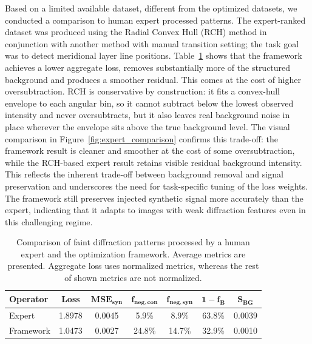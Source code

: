 \documentclass[iucr]{iucrjournals}
\begin{document}
Based on a limited available dataset, different from the optimized datasets, we conducted a comparison to human expert processed patterns. The expert-ranked dataset was produced using the Radial Convex Hull (RCH) method in conjunction with another method with manual transition setting; the task goal was to detect meridional layer line positions. Table~\ref{tab:expert_comparison_metrics} shows that the framework achieves a lower aggregate loss, removes substantially more of the structured background and produces a smoother residual. This comes at the cost of higher oversubtraction. RCH is conservative by construction: it fits a convex-hull envelope to each angular bin, so it cannot subtract below the lowest observed intensity and never oversubtracts, but it also leaves real background noise in place wherever the envelope sits above the true background level. The visual comparison in Figure~\ref{fig:expert_comparison} confirms this trade-off: the framework result is cleaner and smoother at the cost of some oversubtraction, while the RCH-based expert result retains visible residual background intensity. This reflects the inherent trade-off between background removal and signal preservation and underscores the need for task-specific tuning of the loss weights. The framework still preserves injected synthetic signal more accurately than the expert, indicating that it adapts to images with weak diffraction features even in this challenging regime.

\begin{table}[htbp]
\centering
\small
\setlength{\tabcolsep}{4pt}
\renewcommand{\arraystretch}{1.3}
\begin{tabular}{@{}lcccccc@{}}
\toprule
\textbf{Operator} & \textbf{Loss} & $\mathbf{MSE}_{\mathbf{syn}}$ & $\mathbf{f}_{\mathbf{neg,con}}$ & $\mathbf{f}_{\mathbf{neg,syn}}$ & $\mathbf{1-f_B}$ & $\mathbf{S}_{\mathbf{BG}}$ \\
\midrule
Expert & 1.8978 & 0.0045 & 5.9\% & 8.9\% & 63.8\% & 0.0039 \\
Framework & 1.0473 & 0.0027 & 24.8\% & 14.7\% & 32.9\% & 0.0010 \\
\bottomrule
\end{tabular}\\[0.2em]

\caption{Comparison of faint diffraction patterns processed by a human expert and the optimization framework. Average metrics are presented. Aggregate loss uses normalized metrics, whereas the rest of shown metrics are not normalized.}
\label{tab:expert_comparison_metrics}
\end{table}
\end{document}
